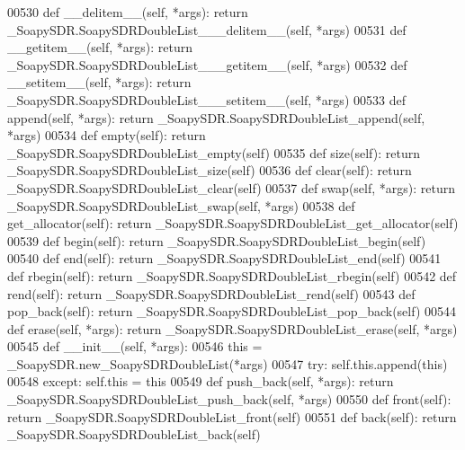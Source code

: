 \begin{DoxyCode}
{{{{00530     \textcolor{keyword}{def }__delitem__(self, *args): \textcolor{keywordflow}{return} \_SoapySDR.SoapySDRDoubleList\_\_\_delitem\_\_(self, *args)
00531     \textcolor{keyword}{def }__getitem__(self, *args): \textcolor{keywordflow}{return} \_SoapySDR.SoapySDRDoubleList\_\_\_getitem\_\_(self, *args)
00532     \textcolor{keyword}{def }__setitem__(self, *args): \textcolor{keywordflow}{return} \_SoapySDR.SoapySDRDoubleList\_\_\_setitem\_\_(self, *args)
00533     \textcolor{keyword}{def }append(self, *args): \textcolor{keywordflow}{return} \_SoapySDR.SoapySDRDoubleList\_append(self, *args)
00534     \textcolor{keyword}{def }empty(self): \textcolor{keywordflow}{return} \_SoapySDR.SoapySDRDoubleList\_empty(self)
00535     \textcolor{keyword}{def }size(self): \textcolor{keywordflow}{return} \_SoapySDR.SoapySDRDoubleList\_size(self)
00536     \textcolor{keyword}{def }clear(self): \textcolor{keywordflow}{return} \_SoapySDR.SoapySDRDoubleList\_clear(self)
00537     \textcolor{keyword}{def }swap(self, *args): \textcolor{keywordflow}{return} \_SoapySDR.SoapySDRDoubleList\_swap(self, *args)
00538     \textcolor{keyword}{def }get_allocator(self): \textcolor{keywordflow}{return} \_SoapySDR.SoapySDRDoubleList\_get\_allocator(self)
00539     \textcolor{keyword}{def }begin(self): \textcolor{keywordflow}{return} \_SoapySDR.SoapySDRDoubleList\_begin(self)
00540     \textcolor{keyword}{def }end(self): \textcolor{keywordflow}{return} \_SoapySDR.SoapySDRDoubleList\_end(self)
00541     \textcolor{keyword}{def }rbegin(self): \textcolor{keywordflow}{return} \_SoapySDR.SoapySDRDoubleList\_rbegin(self)
00542     \textcolor{keyword}{def }rend(self): \textcolor{keywordflow}{return} \_SoapySDR.SoapySDRDoubleList\_rend(self)
00543     \textcolor{keyword}{def }pop_back(self): \textcolor{keywordflow}{return} \_SoapySDR.SoapySDRDoubleList\_pop\_back(self)
00544     \textcolor{keyword}{def }erase(self, *args): \textcolor{keywordflow}{return} \_SoapySDR.SoapySDRDoubleList\_erase(self, *args)
00545     \textcolor{keyword}{def }__init__(self, *args): 
00546         this = \_SoapySDR.new\_SoapySDRDoubleList(*args)
00547         \textcolor{keywordflow}{try}: self.this.append(this)
00548         \textcolor{keywordflow}{except}: self.this = this
00549     \textcolor{keyword}{def }push_back(self, *args): \textcolor{keywordflow}{return} \_SoapySDR.SoapySDRDoubleList\_push\_back(self, *args)
00550     \textcolor{keyword}{def }front(self): \textcolor{keywordflow}{return} \_SoapySDR.SoapySDRDoubleList\_front(self)
00551     \textcolor{keyword}{def }back(self): \textcolor{keywordflow}{return} \_SoapySDR.SoapySDRDoubleList\_back(self)
}}}}
\end{DoxyCode}
